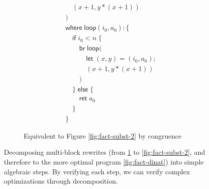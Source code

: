 \documentclass[acmsmall,screen,review]{acmart}
\newcommand{\ms}[1]{\ensuremath{\mathsf{#1}}}
\begin{document}
\begin{figure}
\begin{subfigure}[c]{.5\textwidth}
\begin{align*}
      & \quad(x + 1, y * (x + 1)) \\
      & ) \\
      & \ms{where}\;\ms{loop}(i_0, a_0): \{\\
      & \quad \ms{if}\;i_0 < n\;\{ \\
      & \qquad \ms{br}\;\ms{loop}( \\
      & \qquad \quad \ms{let}\;(x, y) = (i_0, a_0); \\
      & \qquad \quad (x + 1, y * (x + 1)) \\ 
      & \qquad ) \\
      & \quad \}\;\ms{else}\;\{ \\
      & \qquad \ms{ret}\;a_0 \\
      & \quad \} \\
      & \}
    \end{align*}
    \caption{Equivalent to Figure \ref{fig:fact-subst-2} by congruence}
    \label{fig:fact-zero}
  \end{subfigure}
  \caption{
    Decomposing multi-block rewrites (from \ref{fig:fact-zero} to
    \ref{fig:fact-subst-2}, and therefore to the more optimal program 
    \ref{fig:fact-dinat}) into simple algebraic steps. By verifying each step, we can
    verify complex optimizations through decomposition.
  } 
  \Description{}
  \label{fig:fact-dinat-rewrites}
\end{figure}
\end{document}
